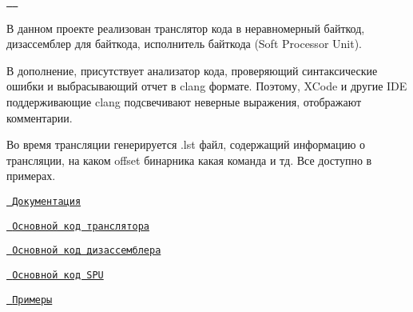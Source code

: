 \href{https://app.codacy.com/gh/AlexRoar/SPUAsm?utm_source=github.com&utm_medium=referral&utm_content=AlexRoar/SPUAsm&utm_campaign=Badge_Grade}{\texttt{ }} \href{https://www.codefactor.io/repository/github/alexroar/spuasm}{\texttt{ }}

В данном проекте реализован транслятор кода в неравномерный байткод, дизассемблер для байткода, исполнитель байткода (Soft Processor Unit).

В дополнение, присутствует анализатор кода, проверяющий синтаксические ошибки и выбрасывающий отчет в clang формате. Поэтому, X\+Code и другие I\+DE поддерживающие clang подсвечивают неверные выражения, отображают комментарии.

Во время трансляции генерируется .lst файл, содержащий информацию о трансляции, на каком offset бинарника какая команда и тд. Все доступно в примерах.

 


\begin{DoxyItemize}
\item \href{https://alexroar.github.io/SPUAsm/html/}{\texttt{ Документация}}
\item \href{https://github.com/AlexRoar/SPUAsm/blob/main/SoftProcessorUnit/Assembly/SPUAssembly.cpp}{\texttt{ Основной код транслятора}}
\item \href{https://github.com/AlexRoar/SPUAsm/blob/main/SoftProcessorUnit/Disassembly/SPUDisAssembly.cpp}{\texttt{ Основной код дизассемблера}}
\item \href{https://github.com/AlexRoar/SPUAsm/blob/main/SoftProcessorUnit/SPU/SPU.cpp}{\texttt{ Основной код S\+PU}}
\item \href{https://github.com/AlexRoar/SPUAsm/tree/main/Examples/SPUAsm/SPUAsm}{\texttt{ Примеры}} 
\end{DoxyItemize}